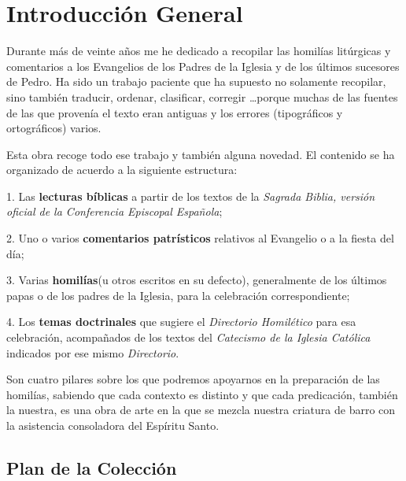 \chapter{Introducción General}

\begin{bodyintro}
	Durante más de veinte años me he dedicado a recopilar las homilías litúrgicas y comentarios a los Evangelios de los Padres de la Iglesia y de los últimos sucesores de Pedro. Ha sido un trabajo paciente que ha supuesto no solamente recopilar, sino también traducir, ordenar, clasificar, corregir \ldots porque muchas de las fuentes de las que provenía el texto eran antiguas y los errores (tipográficos y ortográficos) varios.
	
	Esta obra recoge todo ese trabajo y también alguna novedad. El contenido se ha organizado de acuerdo a la siguiente estructura:
	
	1. Las \textbf{lecturas bíblicas} a partir de los textos de la \textit{Sagrada Biblia, versión oficial de la Conferencia Episcopal Española}\label{fn1};
	
	2. Uno o varios \textbf{comentarios patrísticos} relativos al Evangelio o a la fiesta del día;
	
	3. Varias \textbf{homilías}(u otros escritos en su defecto), generalmente de los últimos papas o de los padres de la Iglesia, para la celebración correspondiente;
	
	4. Los \textbf{temas doctrinales} que sugiere el \textit{Directorio Homilético} para esa celebración, acompañados de los textos del \textit{Catecismo de la Iglesia Católica} indicados por ese mismo \textit{Directorio}.
	
	Son cuatro pilares sobre los que podremos apoyarnos en la preparación de las homilías, sabiendo que cada contexto es distinto y que cada predicación, también la nuestra, es una obra de arte en la que se mezcla nuestra criatura de barro con la asistencia consoladora del Espíritu Santo.
\end{bodyintro}

\newpage

\section {Plan de la Colección}

